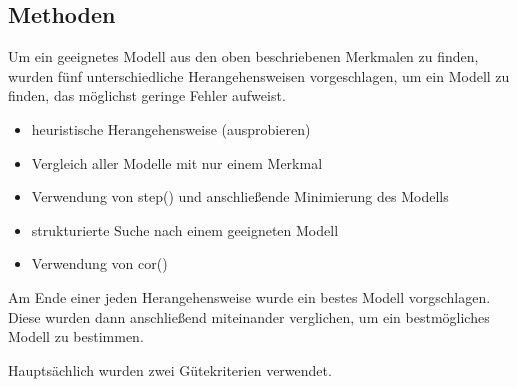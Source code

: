 \subsection{Methoden}
Um ein geeignetes Modell aus den oben beschriebenen Merkmalen zu finden, wurden f\"unf unterschiedliche Herangehensweisen vorgeschlagen, um ein Modell zu finden, das möglichst geringe Fehler aufweist.
\begin{itemize}
	\item heuristische Herangehensweise (ausprobieren)
	\item Vergleich aller Modelle mit nur einem Merkmal
	\item Verwendung von step() und anschließende Minimierung des Modells
	\item strukturierte Suche nach einem geeigneten Modell
	\item Verwendung von cor()
\end{itemize}
Am Ende einer jeden Herangehensweise wurde ein bestes Modell vorgschlagen. Diese wurden dann anschließend miteinander verglichen, um ein bestmögliches Modell zu bestimmen.
\par\smallskip

\noindent
Haupts\"achlich wurden zwei G\"utekriterien verwendet.
\par\smallskip

